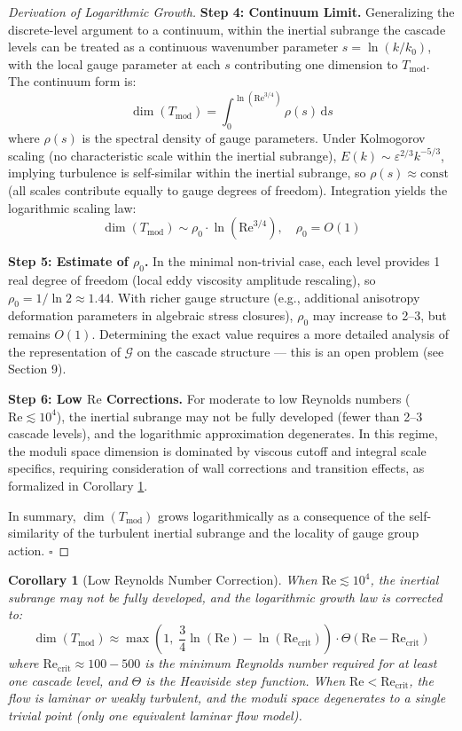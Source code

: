 \documentclass[12pt,a4paper]{article}
\theoremstyle{plain}
\newtheorem{corollary}[theorem]{Corollary}
\theoremstyle{definition}
\theoremstyle{remark}
\newcommand{\G}{\mathcal{G}}
\newcommand{\Tmod}{T_{\text{mod}}}
\newcommand{\ReNum}{\mathrm{Re}}
\newcommand{\eps}{\varepsilon}
\newcommand{\diff}{\mathrm{d}}
\begin{document}
\begin{proof}[Derivation of Logarithmic Growth]
\textbf{Step 4: Continuum Limit.} Generalizing the discrete-level argument to a continuum, within the inertial subrange the cascade levels can be treated as a continuous wavenumber parameter $s = \ln(k/k_0)$, with the local gauge parameter at each $s$ contributing one dimension to $\Tmod$. The continuum form is:
\begin{equation}
\dim(\Tmod) = \int_{0}^{\ln(\ReNum^{3/4})} \rho(s)\,\diff s
\end{equation}
where $\rho(s)$ is the spectral density of gauge parameters. Under Kolmogorov scaling (no characteristic scale within the inertial subrange), $E(k) \sim \eps^{2/3}k^{-5/3}$, implying turbulence is self-similar within the inertial subrange, so $\rho(s) \approx \text{const}$ (all scales contribute equally to gauge degrees of freedom). Integration yields the logarithmic scaling law:
\begin{equation}
\dim(\Tmod) \sim \rho_0 \cdot \ln(\ReNum^{3/4}), \quad \rho_0 = O(1)
\end{equation}

\textbf{Step 5: Estimate of $\rho_0$.} In the minimal non-trivial case, each level provides 1 real degree of freedom (local eddy viscosity amplitude rescaling), so $\rho_0 = 1/\ln 2 \approx 1.44$. With richer gauge structure (e.g., additional anisotropy deformation parameters in algebraic stress closures), $\rho_0$ may increase to 2--3, but remains $O(1)$. Determining the exact value requires a more detailed analysis of the representation of $\G$ on the cascade structure --- this is an open problem (see Section 9).

\textbf{Step 6: Low $\ReNum$ Corrections.} For moderate to low Reynolds numbers ($\ReNum \lesssim 10^4$), the inertial subrange may not be fully developed (fewer than 2--3 cascade levels), and the logarithmic approximation degenerates. In this regime, the moduli space dimension is dominated by viscous cutoff and integral scale specifics, requiring consideration of wall corrections and transition effects, as formalized in Corollary \ref{cor:lowRe}.

In summary, $\dim(\Tmod)$ grows logarithmically as a consequence of the self-similarity of the turbulent inertial subrange and the locality of gauge group action. $\square$
\end{proof}

\begin{corollary}[Low Reynolds Number Correction]\label{cor:lowRe}
When $\ReNum \lesssim 10^4$, the inertial subrange may not be fully developed, and the logarithmic growth law is corrected to:
\begin{equation}
\dim(\Tmod) \approx \max\left(1,\; \frac{3}{4}\ln(\ReNum) - \ln(\ReNum_{\text{crit}})\right) \cdot \Theta(\ReNum - \ReNum_{\text{crit}})
\end{equation}
where $\ReNum_{\text{crit}} \approx 100-500$ is the minimum Reynolds number required for at least one cascade level, and $\Theta$ is the Heaviside step function. When $\ReNum < \ReNum_{\text{crit}}$, the flow is laminar or weakly turbulent, and the moduli space degenerates to a single trivial point (only one equivalent laminar flow model).
\end{corollary}
\end{document}
